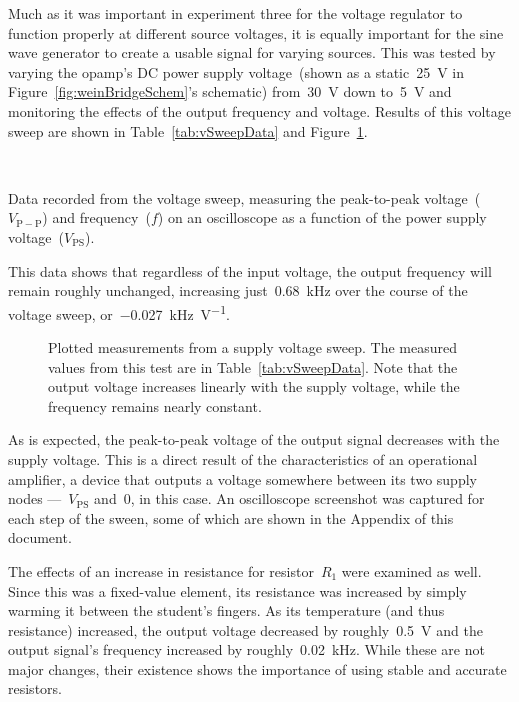 Much as it was important in experiment three for the voltage regulator to
function properly at different source voltages, it is equally important for the
sine wave generator to create a usable signal for varying sources.  This was
tested by varying the opamp's DC power supply voltage~(shown as a
static~\SI{25}{\volt} in Figure~\ref{fig:weinBridgeSchem}'s schematic)
from~\SI{30}{\volt} down to~\SI{5}{\volt} and monitoring the effects of the
output frequency and voltage.  Results of this voltage sweep are shown in
Table~\ref{tab:vSweepData} and Figure~\ref{fig:vSweepPlot}.
%
\begin{table}[H]
	\centering
	\\
	\parbox{.6\textwidth}{
	\caption[Voltage Sweep Data]{Data recorded from the voltage sweep,
		measuring the peak-to-peak voltage~($V_\mathrm{P-P}$) and
		frequency~($f$) on an oscilloscope as a function of the power supply
		voltage~($V_\mathrm{PS}$).}
	\label{tab:vSweepData}}
\end{table}
%
This data shows that regardless of the input voltage, the output frequency will
remain roughly unchanged, increasing just~\SI{0.68}{\kilo\hertz} over the
course of the voltage sweep, or~\SI{-0.027}{\kilo\hertz\per\volt}.
%
\begin{figure}[H]
	\centering
	
	\parbox{4.25in}{
	\caption[Voltage Sweep Plot]{Plotted measurements from a supply voltage
	sweep.  The measured values from this test are in
	Table~\ref{tab:vSweepData}.  Note that the output voltage increases
	linearly with the supply voltage, while the frequency remains nearly
	constant.}
	\label{fig:vSweepPlot}}
\end{figure}
%
As is expected, the peak-to-peak voltage of the output signal decreases with
the supply voltage.  This is a direct result of the characteristics of an
operational amplifier, a device that outputs a voltage somewhere between its
two supply nodes ---~$V_\text{PS}$ and~0, in this case.  An oscilloscope
screenshot was captured for each step of the sween, some of which are shown in
the Appendix  of this document.


The effects of an increase in resistance for resistor~$R_1$ were examined as
well.  Since this was a fixed-value element, its resistance was increased by
simply warming it between the student's fingers.  As its temperature (and thus
resistance) increased, the output voltage decreased by roughly~\SI{0.5}{\volt}
and the output signal's frequency increased by roughly~\SI{0.02}{\kilo\hertz}.
While these are not major changes, their existence shows the importance of
using stable and accurate resistors.

